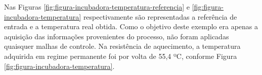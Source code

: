         \begin{figure}[!h]
    	\end{figure}
    	
Nas Figuras \ref{fig:figura-incubadora-temperatura-referencia} e \ref{fig:figura-incubadora-temperatura} respectivamente são representadas a referência de entrada e a temperatura real obtida. Como o objetivo deste exemplo era apenas a aquisição das informações provenientes do processo, não foram aplicadas quaisquer malhas de controle. Na resistência de aquecimento, a temperatura adquirida em regime permanente foi por volta de 55,4 ºC, conforme Figura \ref{fig:figura-incubadora-temperatura}.

        \begin{figure}[!h]
    	\end{figure}

